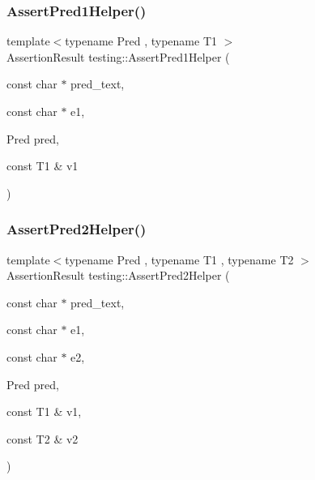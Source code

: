 \subsubsection{\texorpdfstring{AssertPred1Helper()}{AssertPred1Helper()}}
{\footnotesize\ttfamily template$<$typename Pred , typename T1 $>$ \\
Assertion\+Result testing\+::\+Assert\+Pred1\+Helper (\begin{DoxyParamCaption}\item[{const char $\ast$}]{pred\+\_\+text,  }\item[{const char $\ast$}]{e1,  }\item[{Pred}]{pred,  }\item[{const T1 \&}]{v1 }\end{DoxyParamCaption})}

\mbox{\label{namespacetesting_aa6587938029dd8733ecb885068f08247}} 
\subsubsection{\texorpdfstring{AssertPred2Helper()}{AssertPred2Helper()}}
{\footnotesize\ttfamily template$<$typename Pred , typename T1 , typename T2 $>$ \\
Assertion\+Result testing\+::\+Assert\+Pred2\+Helper (\begin{DoxyParamCaption}\item[{const char $\ast$}]{pred\+\_\+text,  }\item[{const char $\ast$}]{e1,  }\item[{const char $\ast$}]{e2,  }\item[{Pred}]{pred,  }\item[{const T1 \&}]{v1,  }\item[{const T2 \&}]{v2 }\end{DoxyParamCaption})}

\mbox{\label{namespacetesting_ac92dcbd00a0ffb2913e65d286e321a22}} 
